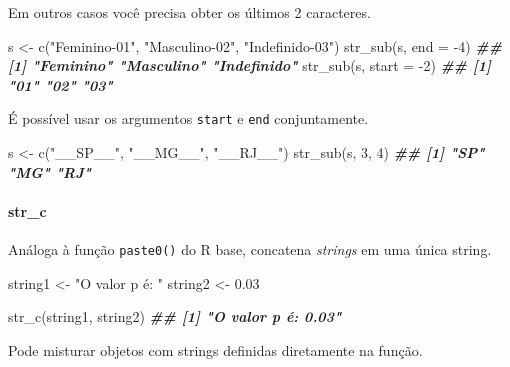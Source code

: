 \documentclass[
]{book}
\newenvironment{Shaded}{\begin{snugshade}}{\end{snugshade}}
\newcommand{\AttributeTok}[1]{\textcolor[rgb]{0.77,0.63,0.00}{#1}}
\newcommand{\DecValTok}[1]{\textcolor[rgb]{0.00,0.00,0.81}{#1}}
\newcommand{\DocumentationTok}[1]{\textcolor[rgb]{0.56,0.35,0.01}{\textbf{\textit{#1}}}}
\newcommand{\FloatTok}[1]{\textcolor[rgb]{0.00,0.00,0.81}{#1}}
\newcommand{\FunctionTok}[1]{\textcolor[rgb]{0.00,0.00,0.00}{#1}}
\newcommand{\NormalTok}[1]{#1}
\newcommand{\OtherTok}[1]{\textcolor[rgb]{0.56,0.35,0.01}{#1}}
\newcommand{\SpecialCharTok}[1]{\textcolor[rgb]{0.00,0.00,0.00}{#1}}
\newcommand{\StringTok}[1]{\textcolor[rgb]{0.31,0.60,0.02}{#1}}
\begin{document}
Em outros casos você precisa obter os últimos 2 caracteres.

\begin{Shaded}
\begin{Highlighting}[]
\NormalTok{s }\OtherTok{\textless{}{-}} \FunctionTok{c}\NormalTok{(}\StringTok{"Feminino{-}01"}\NormalTok{, }\StringTok{"Masculino{-}02"}\NormalTok{, }\StringTok{"Indefinido{-}03"}\NormalTok{)}
\FunctionTok{str\_sub}\NormalTok{(s, }\AttributeTok{end =} \SpecialCharTok{{-}}\DecValTok{4}\NormalTok{)}
\DocumentationTok{\#\# [1] "Feminino"   "Masculino"  "Indefinido"}
\FunctionTok{str\_sub}\NormalTok{(s, }\AttributeTok{start =} \SpecialCharTok{{-}}\DecValTok{2}\NormalTok{)}
\DocumentationTok{\#\# [1] "01" "02" "03"}
\end{Highlighting}
\end{Shaded}

É possível usar os argumentos \texttt{start} e \texttt{end} conjuntamente.

\begin{Shaded}
\begin{Highlighting}[]
\NormalTok{s }\OtherTok{\textless{}{-}} \FunctionTok{c}\NormalTok{(}\StringTok{"\_\_SP\_\_"}\NormalTok{, }\StringTok{"\_\_MG\_\_"}\NormalTok{, }\StringTok{"\_\_RJ\_\_"}\NormalTok{)}
\FunctionTok{str\_sub}\NormalTok{(s, }\DecValTok{3}\NormalTok{, }\DecValTok{4}\NormalTok{)}
\DocumentationTok{\#\# [1] "SP" "MG" "RJ"}
\end{Highlighting}
\end{Shaded}

\hypertarget{str_c}{%
\paragraph*{str\_c}\label{str_c}}

Análoga à função \texttt{paste0()} do R base, concatena \emph{strings} em uma única string.

\begin{Shaded}
\begin{Highlighting}[]
\NormalTok{string1 }\OtherTok{\textless{}{-}} \StringTok{"O valor p é: "}
\NormalTok{string2 }\OtherTok{\textless{}{-}} \FloatTok{0.03}

\FunctionTok{str\_c}\NormalTok{(string1, string2) }
\DocumentationTok{\#\# [1] "O valor p é: 0.03"}
\end{Highlighting}
\end{Shaded}

Pode misturar objetos com strings definidas diretamente na função.
\end{document}
